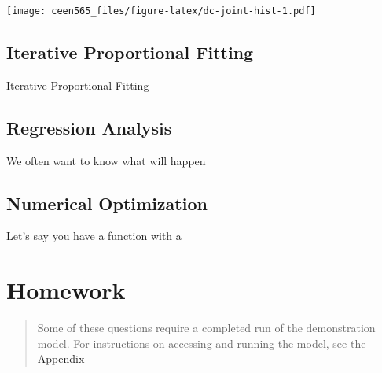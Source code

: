 \documentclass[
]{book}
\begin{document}
\texttt{[image: ceen565\_files/figure-latex/dc-joint-hist-1.pdf]}

\hypertarget{iterative-proportional-fitting}{%
\subsection{Iterative Proportional Fitting}\label{iterative-proportional-fitting}}

Iterative Proportional Fitting

\hypertarget{regression-analysis}{%
\subsection{Regression Analysis}\label{regression-analysis}}

We often want to know what will happen

\hypertarget{numerical-optimization}{%
\subsection{Numerical Optimization}\label{numerical-optimization}}

Let's say you have a function with a

\hypertarget{hw-blocks}{%
\section*{Homework}\label{hw-blocks}}

\begin{quote}
Some of these questions require a completed run of the demonstration model.
For instructions on accessing and running the model, see the \protect\hyperlink{app-demomodel}{Appendix}
\end{quote}
\end{document}
